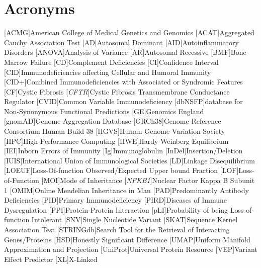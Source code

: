 \section*{Acronyms}
\renewenvironment{description}%
  {\list{}{\labelwidth0pt\itemindent-\leftmargin
    \parsep-1em\itemsep0pt\let\makelabel\descriptionlabel}}
  {\endlist}
\begin{acronym}
 [ACMG]{American College of Medical Genetics and Genomics}
 [ACAT]{Aggregated Cauchy Association Test}
 [AD]{Autosomal Dominant}
 [AID]{Autoinflammatory Disorders}
 [ANOVA]{Analysis of Variance}
 [AR]{Autosomal Recessive}
 [BMF]{Bone Marrow Failure}
 [CD]{Complement Deficiencies}
 [CI]{Confidence Interval}
 [CID]{Immunodeficiencies affecting Cellular and Humoral Immunity}
 [CID+]{Combined Immunodeficiencies with Associated or Syndromic Features}
 [CF]{Cystic Fibrosis}
 [\textit{CFTR}]{Cystic Fibrosis Transmembrane Conductance Regulator}
 [CVID]{Common Variable Immunodeficiency}
 [dbNSFP]{database for Non-Synonymous Functional Predictions}
 [GE]{Genomics England} 
 [gnomAD]{Genome Aggregation Database}
 [GRCh38]{Genome Reference Consortium Human Build 38}
 [HGVS]{Human Genome Variation Society}
 [HPC]{High-Performance Computing}
 [HWE]{Hardy-Weinberg Equilibrium}
 [IEI]{Inborn Errors of Immunity}
  [Ig]{Immunoglobulin}
 [InDel]{Insertion/Deletion}
 [IUIS]{International Union of Immunological Societies}
 [LD]{Linkage Disequilibrium}
 [LOEUF]{Loss-Of-function Observed/Expected Upper bound Fraction}
  [LOF]{Loss-of-Function}
 [MOI]{Mode of Inheritance}
 [\textit{NFKB1}]{Nuclear Factor Kappa B Subunit 1}
 [OMIM]{Online Mendelian Inheritance in Man}
 [PAD]{Predominantly Antibody Deficiencies}
 [PID]{Primary Immunodeficiency}
 [PIRD]{Diseases of Immune Dysregulation}
 [PPI]{Protein-Protein Interaction}
 [pLI]{Probability of being Loss-of-function Intolerant}
 [SNV]{Single Nucleotide Variant}
 [SKAT]{Sequence Kernel Association Test}
 [STRINGdb]{Search Tool for the Retrieval of Interacting Genes/Proteins}
 [HSD]{Honestly Significant Difference}
 [UMAP]{Uniform Manifold Approximation and Projection}
 [UniProt]{Universal Protein Resource}
 [VEP]{Variant Effect Predictor}
 [XL]{X-Linked}
\end{acronym}



